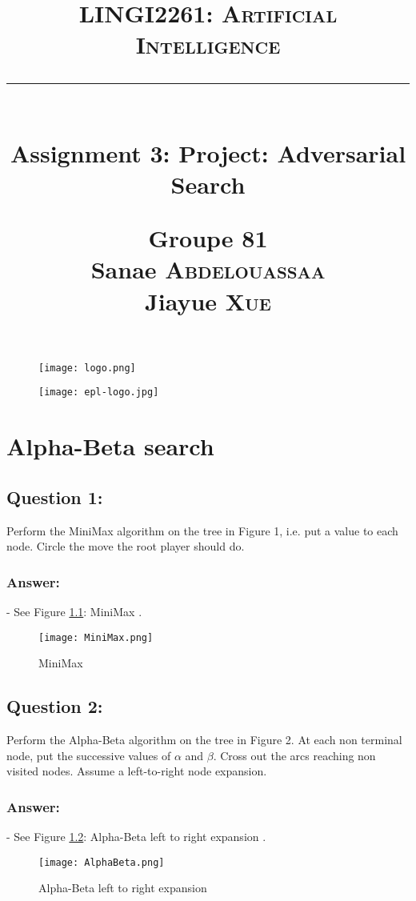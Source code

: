 \documentclass[12pt, a4paper]{report}
\title{
    \vspace{0.5cm} \textcolor{db}{\textsc{LINGI2261: Artificial Intelligence}} \\
    \vspace{0.5 cm} \rule{10 cm}{0.5pt} \\
    \vspace{0.5 cm} \Large{Assignment 3: Project: Adversarial Search} \\
    \vspace{3 cm}
    \begin{flushright}
        \large
        \textbf{Groupe 81} \\
        Sanae \textsc{Abdelouassaa} \\
        Jiayue \textsc{Xue} \\     
    \end{flushright}
    \vspace{0.5 cm}
}
\begin{document}
\begin{figure}[t]
    \texttt{[image: logo.png]}
 \end{figure}   
\begin{figure}[t]
    \hspace{10 cm} \texttt{[image: epl-logo.jpg]}
\end{figure}

\maketitle

\tableofcontents

\chapter{Alpha-Beta search}

\section{Question 1:}
Perform the MiniMax algorithm on the tree in Figure 1, i.e. put a value to each node. Circle the move the root player should do.

\subsection{Answer:}
- See Figure \ref{fig1}: MiniMax .

   \begin{figure}[h]
      \caption{ MiniMax }
      \label{fig1}
         \texttt{[image: MiniMax.png]}
   \end{figure} 
   
\section{Question 2:}
Perform the Alpha-Beta algorithm on the tree in Figure 2. At each non terminal node, put the successive values of $\alpha$ and $\beta$. Cross out the arcs reaching non visited nodes. Assume a left-to-right node expansion.

\subsection{Answer:}
- See Figure \ref{fig2}: Alpha-Beta left to right expansion .

   \begin{figure}[h]
       \caption{Alpha-Beta left to right expansion}
       \label{fig2}
          \texttt{[image: AlphaBeta.png]}
    \end{figure}
    
\end{document}

